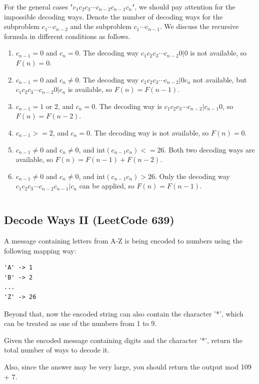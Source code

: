 \documentclass[11pt]{article}
\begin{document}
For the general cases "$c_1 c_2 c_3 \cdots c_{n-2} c_{n-1} c_{n}$", we should pay attention for the impossible decoding ways. 
Denote the number of decoding ways for the subproblem $c_1 \cdots c_{n-2}$ and the subproblem $c_1 \cdots c_{n-1}$.
We discuss the recursive formula in different conditions as follows.
\begin{enumerate}
	\item $c_{n-1}=0$ and $c_{n}=0$. The decoding way $c_1 c_2 c_3 \cdots c_{n-2}  0 | 0$ is not available, so $F(n)=0$.
	\item $c_{n-1}=0$ and $c_{n}\neq 0$. The decoding way $c_1 c_2 c_3 \cdots c_{n-2} | 0 c_{n}$ not available, but $c_1 c_2 c_3 \cdots c_{n-2}  0 | c_{n}$ is available, so $F(n)=F(n-1)$. 
	\item $c_{n-1}=1 \text{ or } 2$, and $c_{n}=0$. The decoding way is $c_1 c_2 c_3 \cdots c_{n-2}  | c_{n-1}  0$, so $F(n)=F(n-2)$.
	\item $c_{n-1}>=2$, and $c_{n}=0$. The decoding way is not available, so $F(n)=0$.
	\item $c_{n-1} \neq 0$ and $c_{n} \neq 0$, and $\text{int}(c_{n-1}c_{n})<=26$. Both two decoding ways are available, so $F(n)=F(n-1)+F(n-2)$.
	\item $c_{n-1} \neq 0$ and $c_{n} \neq 0$, and $\text{int}(c_{n-1}c_{n})>26$. Only the decoding way $c_1 c_2 c_3 \cdots c_{n-2} c_{n-1} | c_{n}$ can be applied, so $F(n)=F(n-1)$.
\end{enumerate}

\inputminted[breaklines=true,frame=leftline, linenos=true]{python}{src/numDecodings_dp.py}

\subsection{Decode Ways II (LeetCode 639)}
A message containing letters from A-Z is being encoded to numbers using the following mapping way:
\begin{verbatim}
'A' -> 1
'B' -> 2
...
'Z' -> 26	
\end{verbatim}

Beyond that, now the encoded string can also contain the character '*', which can be treated as one of the numbers from 1 to 9.

Given the encoded message containing digits and the character '*', return the total number of ways to decode it.

Also, since the answer may be very large, you should return the output mod 109 + 7.
\end{document}
